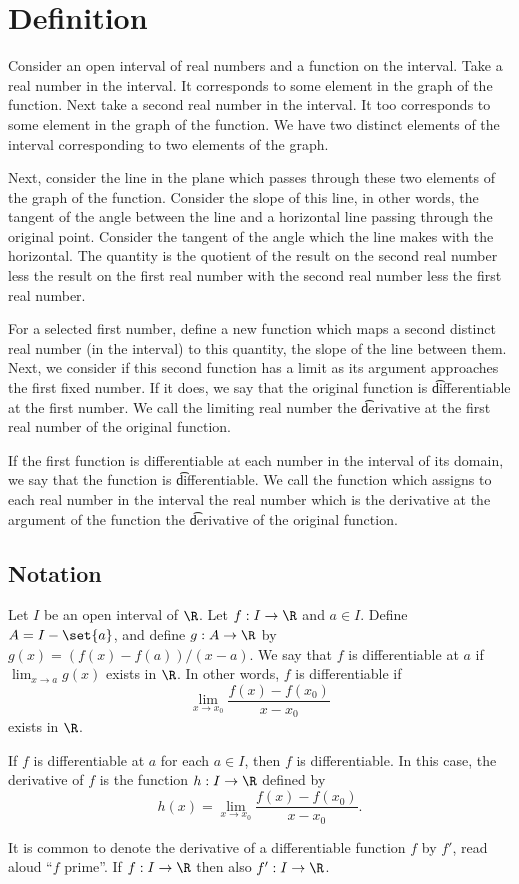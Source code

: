 
\section*{Definition}

Consider an open interval of real numbers and a function on the interval.
Take a real number in the interval. It corresponds to some element in the graph of the function.
Next take a second real number in the interval.
It too corresponds to some element in the graph of the function.
We have two distinct elements of the interval corresponding to two elements of the graph.

Next, consider the line in the plane which passes through these two elements of the graph of the function.
Consider the slope of this line, in other words, the tangent of the angle between the line and a horizontal line passing through the original point.
Consider the tangent of the angle which the line makes with the horizontal.
The quantity is the quotient of the result on the second real number less the result on the first real number with the second real number less the first real number.

For a selected first number, define a new function which maps a second distinct real number (in the interval) to this quantity, the slope of the line between them.
Next, we consider if this second function has a limit as its argument approaches the first fixed number.
If it does, we say that the original function is \t{differentiable at} the first number. We call the limiting real number the \t{derivative at} the first real number of the original function.

If the first function is differentiable at each number in the interval of its domain, we say that the function is \t{differentiable}. We call the function which assigns to each real number in the interval the real number which is the derivative at the argument of the function the \t{derivative of} the original function.

\subsection*{Notation}

Let $I$ be an open interval of $\R $.
Let $f: I \to \R $ and $a \in I$.
Define $A = I - \set{a}$, and define $g: A \to \R $ by $g(x) = (f(x) - f(a))/(x - a)$.
We say that $f$ is differentiable at $a$ if $\lim_{x \to a} g(x)$ exists in $\R $.
In other words, $f$ is differentiable if
\[
\lim_{x \to x_0}
\frac{f(x) - f(x_0)}{x - x_0}
\]
exists in $\R $.

If $f$ is differentiable at $a$ for each $a \in I$, then $f$ is differentiable.
In this case, the derivative of $f$ is the function $h: I \to \R $ defined by
\[
h(x) = \lim_{x \to x_0} \frac{f(x) - f(x_0)}{x - x_0}.
\]

It is common to denote the derivative of a differentiable function $f$ by $f'$, read aloud ``$f$ prime''.
If $f: I \to \R $ then also $f': I \to \R $.
